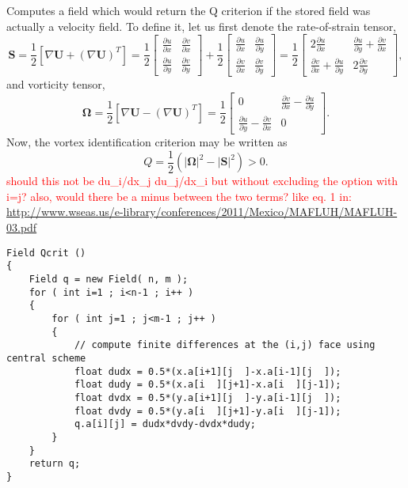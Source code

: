 \documentclass[notitlepage]{article}
\begin{document}
Computes a field which would return the Q criterion if the stored
field was actually a velocity field.
To define it, let us first denote the rate-of-strain tensor,
%
\begin{equation}
\mathbf{S} = \frac{1}{2}\left[\nabla\mathbf{U}+\left(\nabla\mathbf{U}\right)^T\right]
	= \frac{1}{2} \begin{bmatrix}
		\frac{\partial u}{\partial x} & \frac{\partial v}{\partial x} \\
		\frac{\partial u}{\partial y} & \frac{\partial v}{\partial y}
		\end{bmatrix}
	+ \frac{1}{2} \begin{bmatrix}
		\frac{\partial u}{\partial x} & \frac{\partial u}{\partial y} \\
		\frac{\partial v}{\partial x} & \frac{\partial v}{\partial y}
		\end{bmatrix}
	= \frac{1}{2} \begin{bmatrix}
		2\frac{\partial u}{\partial x} & \frac{\partial u}{\partial y} + \frac{\partial v}{\partial x} \\
		\frac{\partial v}{\partial x} + \frac{\partial u}{\partial y} & 2\frac{\partial v}{\partial y}
		\end{bmatrix} ,
\end{equation}
%
and vorticity tensor,
%
\begin{equation}
\mathbf{\Omega} = \frac{1}{2}\left[\nabla\mathbf{U}-\left(\nabla\mathbf{U}\right)^T\right]
	= \frac{1}{2} \begin{bmatrix}
		0 & \frac{\partial v}{\partial x} - \frac{\partial u}{\partial y} \\
		\frac{\partial u}{\partial y} - \frac{\partial v}{\partial x} & 0
		\end{bmatrix} .
\end{equation}
%
Now, the vortex identification criterion may be written as
%
\begin{equation}
Q = \frac{1}{2} \left(\left|\mathbf{\Omega}\right|^2
	- \left|\mathbf{S}\right|^2 \right) > 0.
\end{equation}
\textcolor{red}{should this not be du\_i/dx\_j du\_j/dx\_i but without
excluding the option with i=j? also, would there be a minus between the
two terms? like eq. 1 in:}
\url{http://www.wseas.us/e-library/conferences/2011/Mexico/MAFLUH/MAFLUH-03.pdf}

\begin{lstlisting}[style=myCpp]
Field Qcrit ()
{
	Field q = new Field( n, m );
	for ( int i=1 ; i<n-1 ; i++ )
	{
		for ( int j=1 ; j<m-1 ; j++ )
		{
			// compute finite differences at the (i,j) face using central scheme
			float dudx = 0.5*(x.a[i+1][j  ]-x.a[i-1][j  ]);
			float dudy = 0.5*(x.a[i  ][j+1]-x.a[i  ][j-1]);
			float dvdx = 0.5*(y.a[i+1][j  ]-y.a[i-1][j  ]);
			float dvdy = 0.5*(y.a[i  ][j+1]-y.a[i  ][j-1]);
			q.a[i][j] = dudx*dvdy-dvdx*dudy;
		}
	}
	return q;
}
\end{lstlisting}
\end{document}
